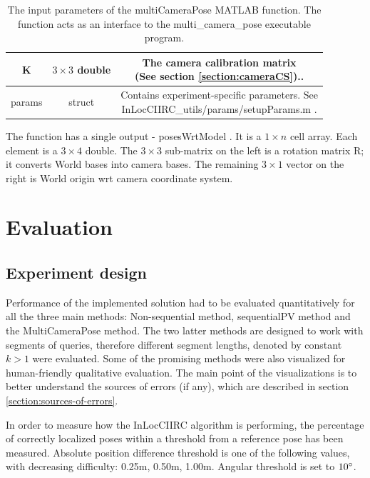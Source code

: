 \documentclass[twoside]{ctuthesis}
\theoremstyle{plain}
\theoremstyle{definition}
\theoremstyle{note}
\newcommand{\code}[1]{{\ttfamily #1%
}}
\begin{document}
\begin{table}[htb!]
\begin{tabular}{|c|c|c|}
		\hline
		\code{K} & $3 \times 3$ double & \makecell{The camera calibration matrix \\ (See section \ref{section:cameraCS}).}. \\
		\hline
		\code{params} & struct & \makecell{Contains experiment-specific parameters. See \\ \code{InLocCIIRC\_utils/params/setupParams.m}.} \\
		\hline
	\end{tabular}
	\caption[Input parameters of \code{multiCameraPose} MATLAB function]{The input parameters of the \code{multiCameraPose} MATLAB function. The function acts as an interface to the \code{multi\_camera\_pose} executable program.}
	\label{tab:MCP_frontend_input}
\end{table}

The function has a single output - \code{posesWrtModel}. It is a $1 \times n$ cell array. Each element is a $3 \times 4$ double. The $3 \times 3$ sub-matrix on the left is a rotation matrix R; it converts World bases into camera bases. The remaining $3 \times 1$ vector on the right is World origin wrt camera coordinate system.

\chapter{Evaluation}
\label{chapter:evaluation}

\section{Experiment design}
Performance of the implemented solution had to be evaluated quantitatively for all the three main methods: Non-sequential method, sequentialPV method and the MultiCameraPose method. The two latter methods are designed to work with segments of queries, therefore different segment lengths, denoted by constant $k>1$ were evaluated. Some of the promising methods were also visualized for human-friendly qualitative evaluation. The main point of the visualizations is to better understand the sources of errors (if any), which are described in section \ref{section:sources-of-errors}.

In order to measure how the InLocCIIRC algorithm is performing, the percentage of correctly localized poses within a threshold from a reference pose has been measured. Absolute position difference threshold is one of the following values, with decreasing difficulty: 0.25m, 0.50m, 1.00m. Angular threshold is set to $10\degree$.
\end{document}
